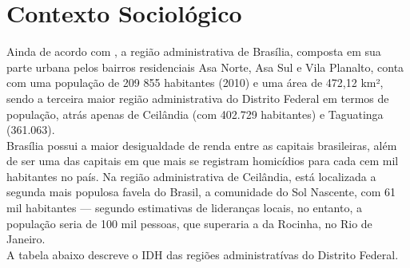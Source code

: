 \section{Contexto Sociológico}

Ainda de acordo com , a região administrativa de Brasília, composta em sua parte urbana pelos bairros residenciais Asa Norte, Asa Sul e Vila Planalto, conta com uma população de 209 855 habitantes (2010) e uma área de 472,12 km², sendo a terceira maior região administrativa do Distrito Federal em termos de população, atrás apenas de Ceilândia (com 402.729 habitantes) e Taguatinga (361.063).\\

Brasília possui a maior desigualdade de renda entre as capitais brasileiras, além de ser uma das capitais em que mais se registram homicídios para cada cem mil habitantes no país. Na região administrativa de Ceilândia, está localizada a segunda mais populosa favela do Brasil, a comunidade do Sol Nascente, com 61 mil habitantes — segundo estimativas de lideranças locais, no entanto, a população seria de 100 mil pessoas, que superaria a da Rocinha, no Rio de Janeiro.\\

A tabela abaixo descreve o IDH das regiões administratívas do Distrito Federal.\\

